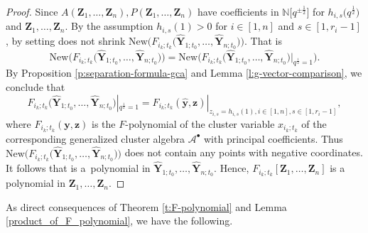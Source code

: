 \documentclass[10pt,a4paper]{amsart}
\numberwithin{equation}{section}
\begin{document}
\begin{proof}
 Since $A(\mathbf{Z}_{1},\dots,\mathbf{Z}_{n}),P(\mathbf{Z}_{1},\dots,\mathbf{Z}_{n})$ have coefficients in $\mathbb{N}\big[q^{\pm\frac{1}{2}}\big]$ for $h_{i,s}\bigl(q^{\frac{1}{2}}\bigr)$ and $\mathbf{Z}_{1},\dots,\mathbf{Z}_{n}$. By the assumption $h_{i,s}(1)>0$ for $i\in[1,n]$ and $s\in[1,r_{i}-1]$, by setting  does not shrink $\text{New}\bigl(F_{i_{k};t_{k}}\bigl(\mathbf{\hat{Y}}_{1;t_{0}},\dots,\mathbf{\hat{Y}}_{n;t_{0}}\bigr)\bigr)$. That is
 \[
 \text{New}\bigl(F_{i_{k};t_{k}}\bigl(\mathbf{\hat{Y}}_{1;t_{0}},\dots,\mathbf{\hat{Y}}_{n;t_{0}}\bigr)\bigr)
 =\text{New}\bigl(F_{i_{k};t_{k}}\bigl(\mathbf{\hat{Y}}_{1;t_{0}},\dots,\mathbf{\hat{Y}}_{n;t_{0}}\bigr)|_{q^{\frac{1}{2}}=1}\bigr).\]
By Proposition \ref{p:separation-formula-gca} and Lemma \ref{l:g-vector-comparison}, we conclude that \[F_{i_{k};t_{k}}\bigl(\mathbf{\hat{Y}}_{1;t_{0}},\dots,\mathbf{\hat{Y}}_{n;t_{0}}\bigr)|_{q^{\frac{1}{2}}=1}=F_{i_k;t_k}(\mathbf{\hat{y}},\mathbf{z})|_{z_{i,s}=h_{i,s}(1),i\in [1,n],s\in [1,r_i-1]},\] where $F_{i_k;t_k}(\mathbf{y},\mathbf{z})$ is the $F$-polynomial of the cluster variable $x_{i_k;t_k}$ of the corresponding generalized cluster algebra $\mathcal{A}^\bullet$ with principal coefficients.
 Thus $\text{New}\bigl(F_{i_{k};t_{k}}\bigl(\mathbf{\hat{Y}}_{1;t_{0}},\dots,\mathbf{\hat{Y}}_{n;t_{0}}\bigr)\bigr)$ does not contain any points with negative coordinates. It follows that  is a~polynomial in $\mathbf{\hat{Y}}_{1;t_{0}},\dots,\mathbf{\hat{Y}}_{n;t_{0}}$. Hence, $F_{i_{k};t_{k}}[\mathbf{Z}_1,\dots,\mathbf{Z}_{n}]$ is a polynomial in $\mathbf{Z}_{1},\dots,\mathbf{Z}_{n}$.
\end{proof}

As direct consequences of Theorem \ref{t:F-polynomial} and Lemma \ref{product_of_F_polynomial}, we have the following.
\end{document}
